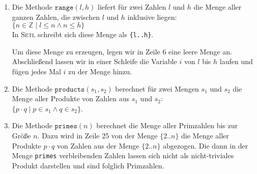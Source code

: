 \begin{enumerate}
\item Die Methode $\texttt{range}(l, h)$ liefert f\"ur zwei Zahlen $l$ und $h$
      die Menge aller ganzen Zahlen, die zwischen $l$ und $h$ inklusive liegen:
      \\[0.2cm]
      \hspace*{1.3cm}
      $\{ n \in \mathbb{Z} \mid l \leq n \wedge n \leq h \}$
      \\[0.2cm]
      In \textsc{Setl} schreibt sich diese Menge als \texttt{\{l..h\}}.  

      Um diese Menge zu erzeugen, legen wir in Zeile 6 eine leere Menge an.
      Abschlie{\ss}end lassen wir in einer Schleife die Variable $i$ von $l$ bis $h$ laufen
      und f\"ugen jedes Mal $i$ zu der Menge hinzu.
\item Die Methode $\texttt{products}(s_1,s_2)$ berechnet f\"ur zwei Mengen $s_1$ und $s_2$
      die Menge aller Produkte von Zahlen aus $s_1$ und $s_2$:
      \\[0.2cm]
      \hspace*{1.3cm}
      $\{ p \cdot q \mid p \in s_1 \wedge q \in s_2 \}$.
\item Die Methode $\mathtt{primes}(n)$ berechnet die Menge aller Primzahlen bis zur Gr\"o{\ss}e
      $n$.   Dazu wird in Zeile 25 von der Menge $\{2 .. n\}$ die Menge
      aller Produkte $p \cdot q$ von Zahlen aus der Menge $\{2 .. n \}$
      abgezogen.  Die dann in der Menge \texttt{primes} verbleibenden Zahlen lassen sich
      nicht als nicht-triviales Produkt darstellen und sind folglich Primzahlen.
\end{enumerate}

